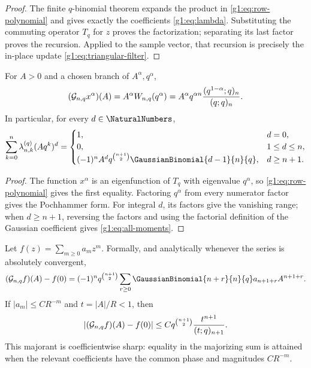 \begin{proof}
The finite $q$-binomial theorem expands the product in
\eqref{g1:eq:row-polynomial} and gives exactly the coefficients
\eqref{g1:eq:lambda}.  Substituting the commuting operator $T_q$ for $z$
proves the factorization; separating its last factor proves the recursion.
Applied to the sample vector, that recursion is precisely the in-place update
\eqref{g1:eq:triangular-filter}.
\end{proof}

\begin{corollary}
\label{g1:cor:power-multiplier}
For $A>0$ and a chosen branch of $A^\alpha,q^\alpha$,
\begin{equation}
 (\mathcal G_{n,q}x^\alpha)(A)
 =A^\alpha W_{n,q}(q^\alpha)
 =A^\alpha q^{\alpha n}{(q^{1-\alpha};q)_n\over(q;q)_n}.
 \label{g1:eq:pure-power}
\end{equation}
In particular, for every $d\in\NaturalNumbers$,
\begin{equation}
 \sum_{k=0}^n\lambda_{n,k}^{(q)}(Aq^k)^d
 =\begin{cases}
  1,&d=0,\\
  0,&1\le d\le n,\\
  (-1)^nA^dq^{\binom{n+1}{2}}
  \GaussianBinomial{d-1}{n}{q},&d\ge n+1.
 \end{cases}
 \label{g1:eq:all-moments}
\end{equation}
\end{corollary}

\begin{proof}
The function $x^\alpha$ is an eigenfunction of $T_q$ with eigenvalue
$q^\alpha$, so \eqref{g1:eq:row-polynomial} gives the first equality.
Factoring $q^\alpha$ from every numerator factor gives the Pochhammer form.
For integral $d$, its factors give the vanishing range; when $d\ge n+1$,
reversing the factors and using the factorial definition of the Gaussian
coefficient gives \eqref{g1:eq:all-moments}.
\end{proof}

\begin{theorem}
\label{g1:thm:sharp-majorant}
Let $f(z)=\sum_{m\ge0}a_mz^m$.  Formally, and analytically whenever the
series is absolutely convergent,
\begin{equation}
 (\Gc_{n,q}f)(A)-f(0)
 =(-1)^nq^{\binom{n+1}{2}}
  \sum_{r\ge0}\GaussianBinomial{n+r}{n}{q}a_{n+1+r}A^{n+1+r}.
 \label{g1:eq:exact-analytic-tail}
\end{equation}
If $|a_m|\le C R^{-m}$ and $t=|A|/R<1$, then
\begin{equation}
 \left|(\mathcal G_{n,q}f)(A)-f(0)\right|
 \le Cq^{\binom{n+1}{2}}{t^{n+1}\over(t;q)_{n+1}}.
 \label{g1:eq:sharp-majorant}
\end{equation}
This majorant is coefficientwise sharp: equality in the majorizing sum is
attained when the relevant coefficients have the common phase and magnitudes
$CR^{-m}$.
\end{theorem}

